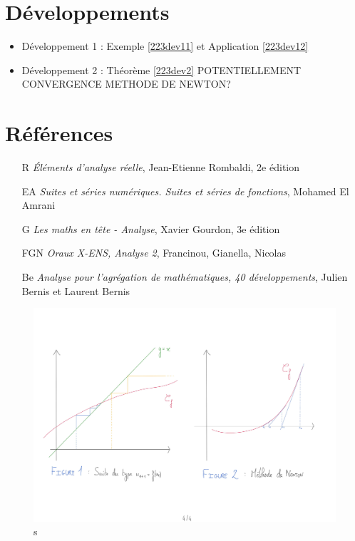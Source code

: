 \documentclass[10pt, a4paper, parskip=full, twoside, twocolumn]{report}
\begin{document}
\section*{Développements}
\begin{itemize}
	\item Développement 1 : Exemple \ref{223dev11} et Application \ref{223dev12}
	\item Développement 2 : Théorème \ref{223dev2} POTENTIELLEMENT CONVERGENCE METHODE DE NEWTON?
\end{itemize}

\section*{Références}
\begin{itemize}	
	\item[R] \emph{Éléments d'analyse réelle}, Jean-Etienne Rombaldi, 2e édition
	\item[EA] \emph{Suites et séries numériques. Suites et séries de fonctions}, Mohamed El Amrani
	\item[G] \emph{Les maths en tête - Analyse}, Xavier Gourdon, 3e édition 
	\item[FGN] \emph{Oraux X-ENS, Analyse 2}, Francinou, Gianella, Nicolas
	\item[Be] \emph{Analyse pour l'agrégation de mathématiques, 40 développements}, Julien Bernis et Laurent Bernis
\end{itemize}

\begin{figure}[!htb]
	\centering
	\includegraphics[trim={0 0 0 0},clip,width=1\linewidth]{img/223.pdf}
	\caption{s}
\end{figure}
\end{document}
